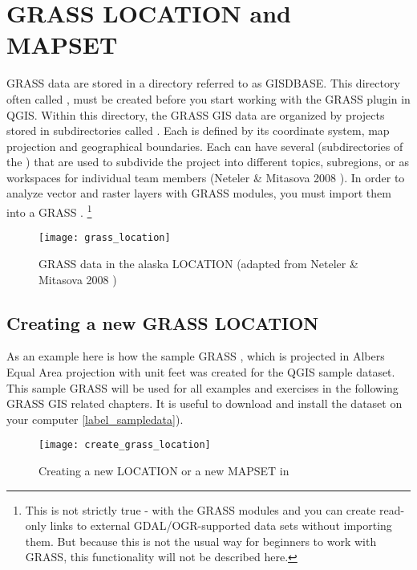 \section{GRASS LOCATION and MAPSET}\label{sec:about_loc}

GRASS data are stored in a directory referred to as GISDBASE. This directory
often called , must be created before you start working
with the GRASS plugin in QGIS. Within this directory, the GRASS GIS data
are organized by projects stored in subdirectories called .
Each  is defined by its coordinate system, map projection
and geographical boundaries. Each  can have several
 (subdirectories of the ) that are used
to subdivide the project into different topics, subregions, or as workspaces
for individual team members (Neteler \& Mitasova 2008
\cite{neteler_mitasova08}). In order to analyze vector and raster layers with
GRASS modules, you must import them into a GRASS .
\footnote{This is not strictly true - with the GRASS modules
 and  you can create read-only links
to external GDAL/OGR-supported data sets without importing them. But because
this is not the usual way for beginners to work with GRASS, this functionality
will not be described here.}

\begin{figure}[ht]
\centering
\texttt{[image: grass\_location]}
\caption{GRASS data in the alaska LOCATION (adapted from Neteler \& Mitasova 2008 \cite{neteler_mitasova08})}\label{fig:grass_location}\end{figure}

\subsection{Creating a new GRASS LOCATION}\label{sec:create_loc}

As an example here is how the sample GRASS
, which is projected in Albers Equal Area
projection with unit feet was created for the QGIS sample dataset. This
sample GRASS  will be used for all examples and
exercises in the following GRASS GIS related chapters. It is useful to
download and install the dataset on your computer \ref{label_sampledata}).

\begin{figure}[ht]
\centering
\texttt{[image: create\_grass\_location]}
\caption{Creating a new \grass LOCATION or a new MAPSET in \qg \nixcaption}
\label{fig:create_grass_location}
\end{figure}

